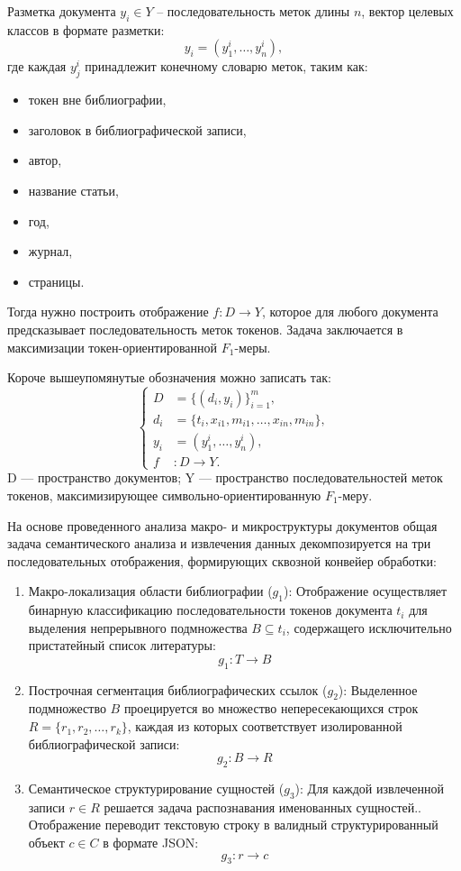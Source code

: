Разметка документа $y_i\in Y$ -- последовательность меток длины $n$, вектор целевых классов в формате разметки:
\begin{equation}
    y_i = (y_1^i,\dots,y_n^i),
\end{equation}
где каждая $y_j^i$ принадлежит конечному словарю меток, таким как:
\begin{itemize}
    \item токен вне библиографии,
    \item заголовок в библиографической записи,
    \item автор,
    \item название статьи,
    \item год,
    \item журнал,
    \item страницы.
\end{itemize}

Тогда нужно построить отображение $f:D\to Y$, которое для любого документа предсказывает последовательность меток токенов. Задача заключается в максимизации токен-ориентированной $F_1$-меры.

Короче вышеупомянутые обозначения можно записать так:
$$
\begin{cases}
D &= \{(d_i, y_i)\}_{i=1}^m,\\
d_i &= \{t_i, x_{i1}, m_{i1}, \ldots, x_{in}, m_{in}\},\\
y_i &= (y^i_1, \ldots, y^i_n),\\
f &: D \to Y.
\end{cases}
$$
D — пространство документов; Y — пространство последовательностей меток токенов, максимизирующее символьно-ориентированную $F_1$-меру.

На основе проведенного анализа макро- и микроструктуры документов общая задача семантического анализа и извлечения данных декомпозируется на три последовательных отображения, формирующих сквозной конвейер обработки:

\begin{enumerate}
    \item Макро-локализация области библиографии ($g_1$): Отображение осуществляет бинарную классификацию последовательности токенов документа $t_i$ для выделения непрерывного подмножества $B \subseteq t_i$, содержащего исключительно пристатейный список литературы:
    \[ g_1 : T \to B \]
    
    \item Построчная сегментация библиографических ссылок ($g_2$): Выделенное подмножество $B$ проецируется во множество непересекающихся строк $R = \{r_1, r_2, \dots, r_k\}$, каждая из которых соответствует изолированной библиографической записи:
    \[ g_2 : B \to R \]
    
    \item Семантическое структурирование сущностей ($g_3$): Для каждой извлеченной записи $r \in R$ решается задача распознавания именованных сущностей.. Отображение переводит текстовую строку в валидный структурированный объект $c \in C$ в формате JSON:
    \[ g_3: r \to c \]
\end{enumerate}

